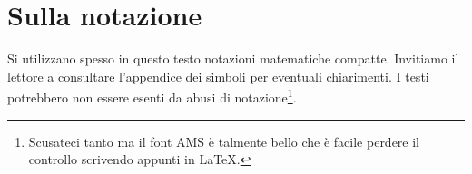 \section*{Sulla notazione}
Si utilizzano spesso in questo testo notazioni matematiche compatte.
Invitiamo il lettore a consultare l'appendice dei simboli per eventuali
chiarimenti. I testi potrebbero non essere esenti da abusi di notazione\footnote{Scusateci tanto
ma il font AMS è talmente bello che è facile perdere il controllo scrivendo
appunti in \LaTeX.}.

